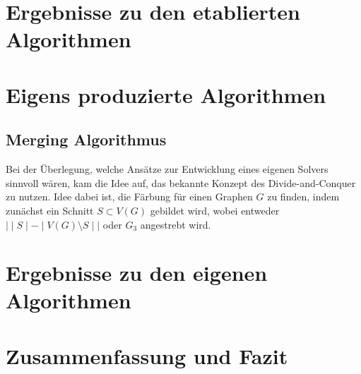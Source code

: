 \documentclass[11pt]{article}
\begin{document}
\section{Ergebnisse zu den etablierten Algorithmen} %
\section{Eigens produzierte Algorithmen} %
\subsection{Merging Algorithmus}
Bei der Überlegung, welche Ansätze zur Entwicklung eines eigenen Solvers sinnvoll wären,
kam die Idee auf, das bekannte Konzept des Divide-and-Conquer zu nutzen.
Idee dabei ist, die Färbung für einen Graphen $G$ zu finden, indem zunächst ein Schnitt $S\subset V(G)$ gebildet wird, 
wobei entweder $\Big| \mid S\mid-\mid V(G)\setminus S\mid \Big|$ oder $G_{3}$ angestrebt wird.

\section{Ergebnisse zu den eigenen Algorithmen} %
\section{Zusammenfassung und Fazit} %



\end{document}
